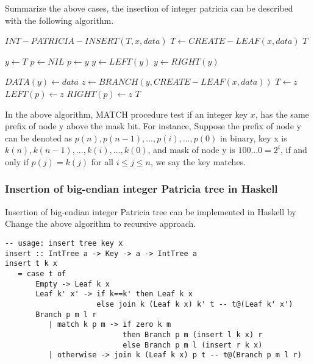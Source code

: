 \documentclass{article}
\begin{document}
Summarize the above cases, the insertion of integer patricia can be described
with the following algorithm.

\begin{algorithmic}
\STATE $INT-PATRICIA-INSERT(T, x, data)$
   \STATE $T \leftarrow CREATE-LEAF(x, data)$
   \RETURN $T$
\ENDIF

\STATE $y \leftarrow T$
\STATE $p \leftarrow NIL$
  \STATE $p \leftarrow y$
    \STATE $y \leftarrow LEFT(y)$
  \ELSE
    \STATE $y \leftarrow RIGHT(y)$
  \ENDIF
\ENDWHILE

  \STATE $DATA(y) \leftarrow data$ 
\ELSE
  \STATE $z \leftarrow BRANCH(y, CREATE-LEAF(x, data))$
    \STATE $T \leftarrow z$
  \ELSE
      \STATE $LEFT(p) \leftarrow z$
    \ELSE
      \STATE $RIGHT(p) \leftarrow z$
    \ENDIF
  \ENDIF
\ENDIF
\RETURN $T$
\end{algorithmic}

In the above algorithm, MATCH procedure test if an integer key $x$, has 
the same prefix of node y above the mask bit. For instance,
Suppose the prefix of node y can be denoted as 
$p(n), p(n-1), ..., p(i), ..., p(0)$ in binary, key x is
$k(n), k(n-1), ..., k(i), ..., k(0)$, and mask of node y is 
$100...0=2^i$, if and only if $p(j)=k(j)$ for all $i \leq j \leq n$, 
we say the key matches.

\subsubsection*{Insertion of big-endian integer Patricia tree in Haskell}
Insertion of big-endian integer Patricia tree can be implemented in Haskell
by Change the above algorithm to recursive approach.

\lstset{language=Haskell}
\begin{lstlisting}
-- usage: insert tree key x
insert :: IntTree a -> Key -> a -> IntTree a
insert t k x 
   = case t of
       Empty -> Leaf k x
       Leaf k' x' -> if k==k' then Leaf k x
                     else join k (Leaf k x) k' t -- t@(Leaf k' x')
       Branch p m l r
          | match k p m -> if zero k m
                           then Branch p m (insert l k x) r
                           else Branch p m l (insert r k x)
          | otherwise -> join k (Leaf k x) p t -- t@(Branch p m l r)
\end{lstlisting}
\end{document}
